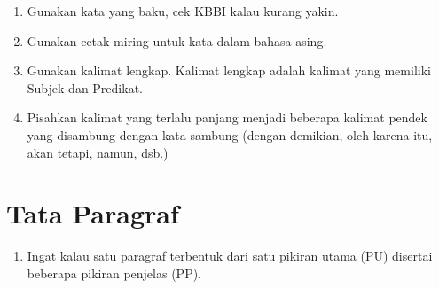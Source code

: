 \begin{enumerate}
    \item Gunakan kata yang baku, cek KBBI kalau kurang yakin.
    \item Gunakan cetak miring untuk kata dalam bahasa asing.
    \item Gunakan kalimat lengkap. Kalimat lengkap adalah kalimat yang memiliki Subjek dan Predikat.
    \item Pisahkan kalimat yang terlalu panjang menjadi beberapa kalimat pendek yang disambung dengan kata sambung (dengan demikian, oleh karena itu, akan tetapi, namun, dsb.)
\end{enumerate}

\section{Tata Paragraf}

\begin{enumerate}
    \item Ingat kalau satu paragraf terbentuk dari satu pikiran utama (PU) disertai beberapa pikiran penjelas (PP).
\end{enumerate}
